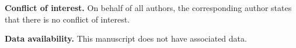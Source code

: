 \documentclass[notitlepage,11pt,reqno]{amsart}
\theoremstyle{definition}
\numberwithin{equation}{section}
\begin{document}
\bigskip
\noindent\textbf{Conflict of interest.} On behalf of all authors, the corresponding author states that there is no conflict of interest.

\bigskip
\noindent\textbf{Data availability.} This manuscript does not have associated data.















\end{document}
